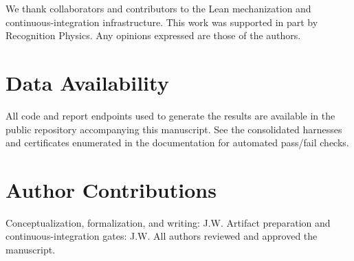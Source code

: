 \documentclass[aps,prd,twocolumn,superscriptaddress,nofootinbib,floatfix,longbibliography]{revtex4-2}
\begin{document}
\begin{acknowledgments}
We thank collaborators and contributors to the Lean mechanization and continuous-integration infrastructure. This work was supported in part by Recognition Physics. Any opinions expressed are those of the authors.
\end{acknowledgments}

\section*{Data Availability}
All code and report endpoints used to generate the results are available in the public repository accompanying this manuscript. See the consolidated harnesses and certificates enumerated in the documentation for automated pass/fail checks.

\section*{Author Contributions}
Conceptualization, formalization, and writing: J.W. Artifact preparation and continuous-integration gates: J.W. All authors reviewed and approved the manuscript.



\end{document}
